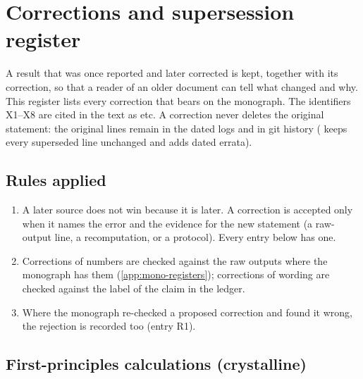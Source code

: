 \chapter{Corrections and supersession register}
\label{app:mono-corrections}

A result that was once reported and later corrected is kept, together with its correction, so that a reader of an
older document can tell what changed and why. This register lists every correction that bears on the monograph. The
identifiers X1--X8 are cited in the text as  etc. A correction never deletes the original statement: the
original lines remain in the dated logs and in git history ( keeps every superseded line
unchanged and adds dated errata).

\section{Rules applied}
\begin{enumerate}
\item A later source does not win because it is later. A correction is accepted only when it names the error and the
evidence for the new statement (a raw-output line, a recomputation, or a protocol). Every entry below has one.
\item Corrections of numbers are checked against the raw outputs where the monograph has them
(\cref{app:mono-registers}); corrections of wording are checked against the label of the claim in the ledger.
\item Where the monograph re-checked a proposed correction and found it wrong, the rejection is recorded too
(entry R1).
\end{enumerate}

\section{First-principles calculations (crystalline)}

